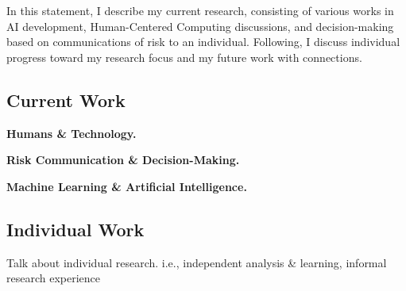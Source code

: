 \documentclass{article}
\begin{document}
\indent In this statement, I describe my current research, consisting of various works in AI development, Human-Centered Computing discussions, and decision-making based on communications of risk to an individual. Following, I discuss individual progress toward my research focus and my future work with connections. 

\vspace{10pt}
\begin{center}
    \section*{Current Work}
\end{center}

\begin{center}
    \item \textbf{Humans \& Technology.}
\end{center}

\indent \lipsum[1]

\begin{center}
    \item \textbf{Risk Communication \& Decision-Making.}    
\end{center}

\indent \lipsum[1]

\begin{center}
    \item \textbf{Machine Learning \& Artificial Intelligence.}
\end{center}

\indent \lipsum[1]

\vspace{10pt}
\begin{center}
    \item \section*{Individual Work}
\end{center}

Talk about individual research. i.e., independent analysis \& learning, informal research experience
\end{document}
